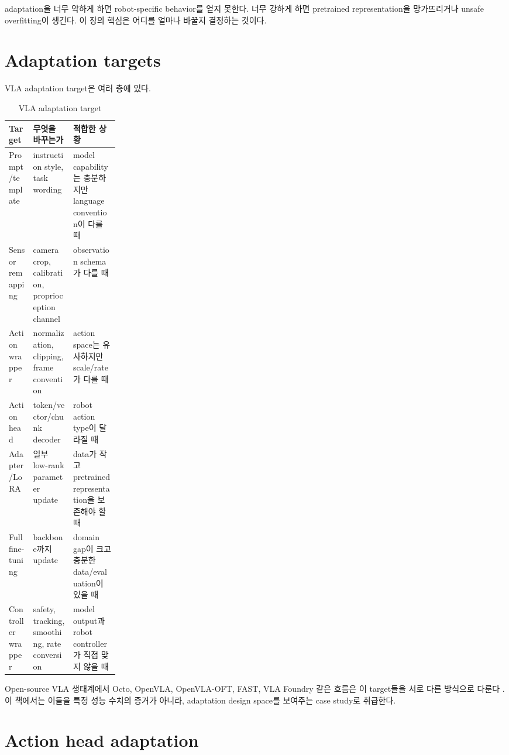 adaptation을 너무 약하게 하면 robot-specific behavior를 얻지 못한다. 너무 강하게 하면 pretrained representation을 망가뜨리거나 unsafe overfitting이 생긴다. 이 장의 핵심은 어디를 얼마나 바꿀지 결정하는 것이다.

\section{Adaptation targets}

VLA adaptation target은 여러 층에 있다.
\begin{table}[h]
  \centering
  \caption{VLA adaptation target}
  \begin{tabularx}{\linewidth}{p{0.22\linewidth}X X}
    \toprule
    Target & 무엇을 바꾸는가 & 적합한 상황 \\
    \midrule
    Prompt/template & instruction style, task wording & model capability는 충분하지만 language convention이 다를 때 \\
    Sensor remapping & camera crop, calibration, proprioception channel & observation schema가 다를 때 \\
    Action wrapper & normalization, clipping, frame convention & action space는 유사하지만 scale/rate가 다를 때 \\
    Action head & token/vector/chunk decoder & robot action type이 달라질 때 \\
    Adapter/LoRA & 일부 low-rank parameter update & data가 작고 pretrained representation을 보존해야 할 때 \\
    Full fine-tuning & backbone까지 update & domain gap이 크고 충분한 data/evaluation이 있을 때 \\
    Controller wrapper & safety, tracking, smoothing, rate conversion & model output과 robot controller가 직접 맞지 않을 때 \\
    \bottomrule
  \end{tabularx}
  \label{tab:ch15-adaptation-targets}
\end{table}

Open-source VLA 생태계에서 Octo, OpenVLA, OpenVLA-OFT, FAST, VLA Foundry 같은 흐름은 이 target들을 서로 다른 방식으로 다룬다 \cite{octo2024,openvla2024,openvlaoft2025,fast2025,vlafoundry2026}. 이 책에서는 이들을 특정 성능 수치의 증거가 아니라, adaptation design space를 보여주는 case study로 취급한다.

\section{Action head adaptation}

